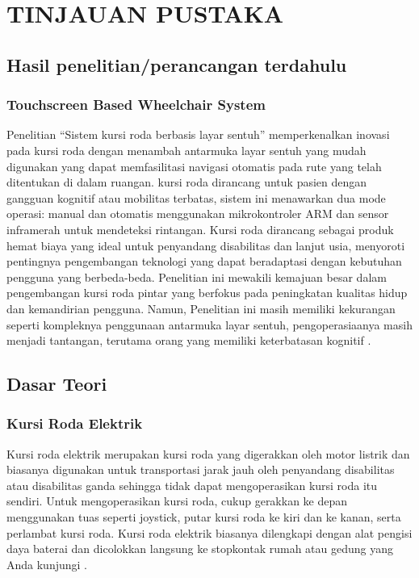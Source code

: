 \chapter{TINJAUAN PUSTAKA}

\section{Hasil penelitian/perancangan terdahulu}
\subsection{Touchscreen Based Wheelchair System}
Penelitian “Sistem kursi roda berbasis layar sentuh” memperkenalkan inovasi pada kursi roda dengan menambah antarmuka layar sentuh yang mudah digunakan yang dapat memfasilitasi navigasi otomatis pada rute yang telah ditentukan di dalam ruangan. kursi roda dirancang untuk pasien dengan gangguan kognitif atau mobilitas terbatas, sistem ini menawarkan dua mode operasi: manual dan otomatis menggunakan mikrokontroler ARM dan sensor inframerah untuk mendeteksi rintangan. Kursi roda dirancang sebagai produk hemat biaya yang ideal untuk penyandang disabilitas dan lanjut usia, menyoroti pentingnya pengembangan teknologi yang dapat beradaptasi dengan kebutuhan pengguna yang berbeda-beda. Penelitian ini mewakili kemajuan besar dalam pengembangan kursi roda pintar yang berfokus pada peningkatan kualitas hidup dan kemandirian pengguna. Namun, Penelitian ini masih memiliki kekurangan seperti kompleknya penggunaan antarmuka layar sentuh, pengoperasiaanya masih menjadi tantangan, terutama orang yang memiliki keterbatasan kognitif \parencite{PosugadeWheelchair}.  

\section{Dasar Teori}
\subsection{Kursi Roda Elektrik}
Kursi roda elektrik merupakan kursi roda yang digerakkan oleh motor listrik dan biasanya digunakan untuk transportasi jarak jauh oleh penyandang disabilitas atau disabilitas ganda sehingga tidak dapat mengoperasikan kursi roda itu sendiri. Untuk mengoperasikan kursi roda, cukup gerakkan ke depan menggunakan tuas seperti joystick, putar kursi roda ke kiri dan ke kanan, serta perlambat kursi roda. Kursi roda elektrik biasanya dilengkapi dengan alat pengisi daya baterai dan dicolokkan langsung ke stopkontak rumah atau gedung yang Anda kunjungi \parencite{Fahrozi2020AutoWheelChair}.


